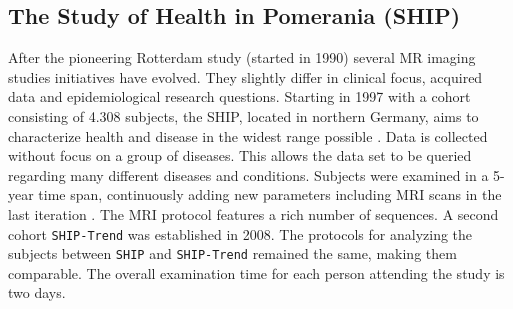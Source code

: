 \documentclass[journal]{style/vgtc} 			          %
\begin{document}


\subsection{The Study of Health in Pomerania (SHIP)}
After the pioneering Rotterdam study (started in 1990) several MR imaging studies initiatives have evolved.
%
They slightly differ in clinical focus, acquired data and epidemiological research questions.
%
Starting in 1997 with a cohort consisting of 4.308 subjects, the SHIP, located in northern Germany, aims to characterize health and disease in the widest range possible \cite{Volzke2011}.
%
Data is collected without focus on a group of diseases.
%
This allows the data set to be queried regarding many different diseases and conditions.
%
Subjects were examined in a 5-year time span, continuously adding new parameters including MRI scans in the last iteration \cite{Hegenscheid2009}.
%
The MRI protocol features a rich number of sequences.
%
%
A second cohort \texttt{SHIP-Trend} was established in 2008.
%
The protocols for analyzing the subjects between \texttt{SHIP} and \texttt{SHIP-Trend} remained the same, making them comparable.
%
The overall examination time for each person attending the study is two days.
\end{document}

